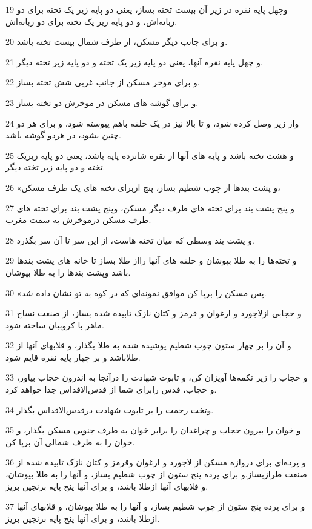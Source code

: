 \par 19 وچهل پایه نقره در زیر آن بیست تخته بساز، یعنی دو پایه زیر یک تخته برای دو زبانه‌اش، و دو پایه زیر یک تخته برای دو زبانه‌اش.
\par 20 و برای جانب دیگر مسکن، از طرف شمال بیست تخته باشد.
\par 21 و چهل پایه نقره آنها، یعنی دو پایه زیر یک تخته و دو پایه زیر تخته دیگر.
\par 22 و برای موخر مسکن از جانب غربی شش تخته بساز.
\par 23 و برای گوشه های مسکن در موخرش دو تخته بساز.
\par 24 واز زیر وصل کرده شود، و تا بالا نیز در یک حلقه باهم پیوسته شود، و برای هر دو چنین بشود، در هردو گوشه باشد.
\par 25 و هشت تخته باشد و پایه های آنها از نقره شانزده پایه باشد، یعنی دو پایه زیریک تخته و دو پایه زیر تخته دیگر.
\par 26 «و پشت بندها از چوب شطیم بساز، پنج ازبرای تخته های یک طرف مسکن،
\par 27 و پنج پشت بند برای تخته های طرف دیگر مسکن، وپنج پشت بند برای تخته های طرف مسکن درموخرش به سمت مغرب.
\par 28 و پشت بند وسطی که میان تخته هاست، از این سر تا آن سر بگذرد.
\par 29 و تخته‌ها را به طلا بپوشان و حلقه های آنها رااز طلا بساز تا خانه های پشت بندها باشد وپشت بندها را به طلا بپوشان.
\par 30 «پس مسکن را برپا کن موافق نمونه‌ای که در کوه به تو نشان داده شد.
\par 31 و حجابی ازلاجورد و ارغوان و قرمز و کتان نازک تابیده شده بساز، از صنعت نساج ماهر با کروبیان ساخته شود.
\par 32 و آن را بر چهار ستون چوب شطیم پوشیده شده به طلا بگذار، و قلابهای آنها از طلاباشد و بر چهار پایه نقره قایم شود.
\par 33 و حجاب را زیر تکمه‌ها آویزان کن، و تابوت شهادت را درآنجا به اندرون حجاب بیاور، و حجاب، قدس رابرای شما از قدس‌الاقداس جدا خواهد کرد.
\par 34 وتخت رحمت را بر تابوت شهادت درقدس‌الاقداس بگذار.
\par 35 و خوان را بیرون حجاب و چراغدان را برابر خوان به طرف جنوبی مسکن بگذار، و خوان را به طرف شمالی آن برپا کن.
\par 36 و پرده‌ای برای دروازه مسکن از لاجورد و ارغوان وقرمز و کتان نازک تابیده شده از صنعت طرازبساز.و برای پرده پنج ستون از چوب شطیم بساز، و آنها را به طلا بپوشان، و قلابهای آنها ازطلا باشد، و برای آنها پنج پایه برنجین بریز.
\par 37 و برای پرده پنج ستون از چوب شطیم بساز، و آنها را به طلا بپوشان، و قلابهای آنها ازطلا باشد، و برای آنها پنج پایه برنجین بریز.
 

